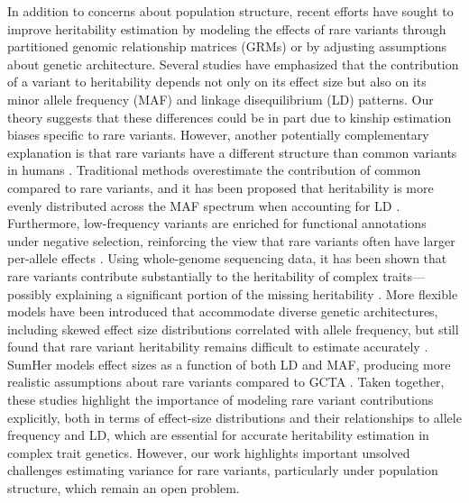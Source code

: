\documentclass[11pt]{article}
\begin{document}
In addition to concerns about population structure, recent efforts have sought to improve heritability estimation by modeling the effects of rare variants through partitioned genomic relationship matrices (GRMs) or by adjusting assumptions about genetic architecture. Several studies have emphasized that the contribution of a variant to heritability depends not only on its effect size but also on its minor allele frequency (MAF) and linkage disequilibrium (LD) patterns. 
Our theory suggests that these differences could be in part due to kinship estimation biases specific to rare variants.
However, another potentially complementary explanation is that rare variants have a different structure than common variants in humans \citep{zaidi_demographic_2020}.
Traditional methods overestimate the contribution of common compared to rare variants, and it has been proposed that heritability is more evenly distributed across the MAF spectrum when accounting for LD \citep{speed2017reevaluation}. Furthermore, low-frequency variants are enriched for functional annotations under negative selection, reinforcing the view that rare variants often have larger per-allele effects \citep{gazal2018functional}. Using whole-genome sequencing data, it has been shown that rare variants contribute substantially to the heritability of complex traits—possibly explaining a significant portion of the missing heritability \citep{wainschtein2022assessing}. More flexible models have been introduced that accommodate diverse genetic architectures, including skewed effect size distributions correlated with allele frequency, but still found that rare variant heritability remains difficult to estimate accurately \citep{hou2019accurate}. SumHer models effect sizes as a function of both LD and MAF, producing more realistic assumptions about rare variants compared to GCTA \citep{speed2019sumher}. Taken together, these studies highlight the importance of modeling rare variant contributions explicitly, both in terms of effect-size distributions and their relationships to allele frequency and LD, which are essential for accurate heritability estimation in complex trait genetics.
However, our work highlights important unsolved challenges estimating variance for rare variants, particularly under population structure, which remain an open problem.
\end{document}
